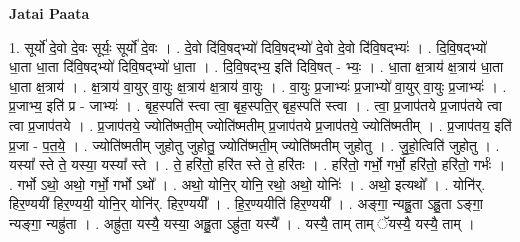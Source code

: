\documentclass[17pt]{extarticle}
\begin{document}
\textbf{Jatai Paata} \newline

1. सूर्यो॑ दे॒वो दे॒वः सूर्यः॒ सूर्यो॑ दे॒वः । . दे॒वो दि॑वि॒षद्भ्यो॑ दिवि॒षद्भ्यो॑ दे॒वो दे॒वो दि॑वि॒षद्भ्यः॑ । . दि॒वि॒षद्भ्यो॑ धा॒ता धा॒ता दि॑वि॒षद्भ्यो॑ दिवि॒षद्भ्यो॑ धा॒ता । . दि॒वि॒षद्भ्य॒ इति॑ दिवि॒षत् - भ्यः॒ । . धा॒ता क्ष॒त्राय॑ क्ष॒त्राय॑ धा॒ता धा॒ता क्ष॒त्राय॑ । . क्ष॒त्राय॑ वा॒युर् वा॒युः क्ष॒त्राय॑ क्ष॒त्राय॑ वा॒युः । . वा॒युः प्र॒जाभ्यः॑ प्र॒जाभ्यो॑ वा॒युर् वा॒युः प्र॒जाभ्यः॑ । . प्र॒जाभ्य॒ इति॑ प्र - जाभ्यः॑ । . बृह॒स्पति॑ स्त्वा त्वा॒ बृह॒स्पति॒र् बृह॒स्पति॑ स्त्वा । . त्वा॒ प्र॒जाप॑तये प्र॒जाप॑तये त्वा त्वा प्र॒जाप॑तये । . प्र॒जाप॑तये॒ ज्योति॑ष्मती॒म् ज्योति॑ष्मतीम् प्र॒जाप॑तये प्र॒जाप॑तये॒ ज्योति॑ष्मतीम् । . प्र॒जाप॑तय॒ इति॑ प्र॒जा - प॒त॒ये॒ । . ज्योति॑ष्मतीम् जुहोतु जुहोतु॒ ज्योति॑ष्मती॒म् ज्योति॑ष्मतीम् जुहोतु । . जु॒हो॒त्विति॑ जुहोतु । . यस्या᳚ स्ते ते॒ यस्या॒ यस्या᳚ स्ते । . ते॒ हरि॑तो॒ हरि॑त स्ते ते॒ हरि॑तः । . हरि॑तो॒ गर्भो॒ गर्भो॒ हरि॑तो॒ हरि॑तो॒ गर्भः॑ । . गर्भो ऽथो॒ अथो॒ गर्भो॒ गर्भो ऽथो᳚ । . अथो॒ योनि॒र् योनि॒ रथो॒ अथो॒ योनिः॑ । . अथो॒ इत्यथो᳚ । . योनि॑र्. हिर॒ण्ययी॑ हिर॒ण्ययी॒ योनि॒र् योनि॑र्. हिर॒ण्ययी᳚ । . हि॒र॒ण्ययीति॑ हिर॒ण्ययी᳚ । . अङ्गा॒ न्यह्रु॒ता ऽह्रु॒ता ऽङ्गा॒ न्यङ्गा॒ न्यह्रु॑ता । . अह्रु॑ता॒ यस्यै॒ यस्या॒ अह्रु॒ता ऽह्रु॑ता॒ यस्यै᳚ । . यस्यै॒ ताम् ताम् ॅयस्यै॒ यस्यै॒ ताम् । \newline
\end{document}

